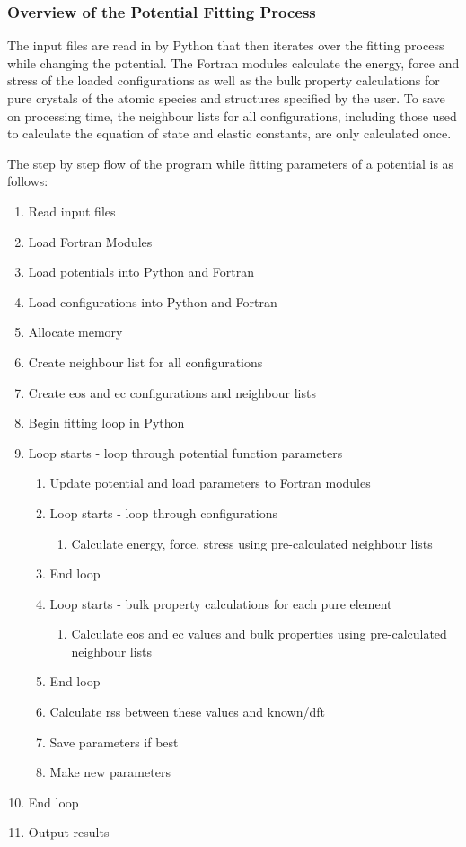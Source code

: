 \subsubsection{Overview of the Potential Fitting Process}

The input files are read in by Python that then iterates over the fitting process while changing the potential.  The Fortran modules calculate the energy, force and stress of the loaded configurations as well as the bulk property calculations for pure crystals of the atomic species and structures specified by the user.  To save on processing time, the neighbour lists for all configurations, including those used to calculate the equation of state and elastic constants, are only calculated once. 

The step by step flow of the program while fitting parameters of a potential is as follows:

\begin{enumerate}
\item Read input files
\item Load Fortran Modules
\item Load potentials into Python and Fortran
\item Load configurations into Python and Fortran
\item Allocate memory
\item Create neighbour list for all configurations
\item Create eos and ec configurations and neighbour lists
\item Begin fitting loop in Python
\item Loop starts - loop through potential function parameters
\begin{enumerate}
\item Update potential and load parameters to Fortran modules
\item Loop starts - loop through configurations
\begin{enumerate}
\item Calculate energy, force, stress using pre-calculated neighbour lists
\end{enumerate}
\item End loop
\item Loop starts - bulk property calculations for each pure element
\begin{enumerate}
\item Calculate eos and ec values and bulk properties using pre-calculated neighbour lists
\end{enumerate}
\item End loop
\item Calculate rss between these values and known/dft
\item Save parameters if best
\item Make new parameters
\end{enumerate}
\item End loop
\item Output results
\end{enumerate}

